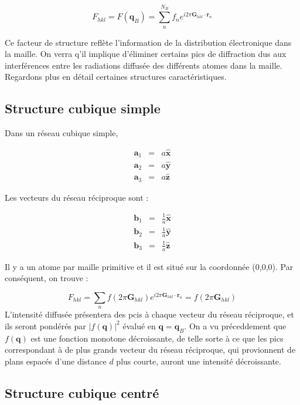 \begin{equation}
    F_{hkl} = F(\mathbf{q}_B) = \sum_n^{N_B} f_n e^{i2\pi \mathbf{G}_{hkl}\cdot\mathbf{r}_n}
\end{equation}

Ce facteur de structure reflète l'information de la distribution électronique
dans la maille. On verra q'il implique d'éliminer certains pics de diffraction
dus aux interférences entre les radiations diffusée des différents atomes dans
la maille.
Regardons plus en détail certaines structures caractéristiques.

\subsection{Structure cubique simple}

Dans un réseau cubique simple,

\begin{eqnarray}
    \mathbf{a}_1 & = & a \mathbf{\hat x} \\
    \mathbf{a}_2 & = & a \mathbf{\hat y} \\
    \mathbf{a}_3 & = & a \mathbf{\hat z}
\end{eqnarray}

Les vecteurs du réseau réciproque sont :

\begin{eqnarray}
    \mathbf{b}_1 & = & \frac{1}{a} \mathbf{\hat x} \\
    \mathbf{b}_2 & = & \frac{1}{a} \mathbf{\hat y} \\
    \mathbf{b}_3 & = & \frac{1}{a} \mathbf{\hat z}
\end{eqnarray}

Il y a un atome par maille primitive et il est situé sur la coordonnée (0,0,0).
Par conséquent, on trouve :

\begin{equation}
    F_{hkl} = \sum_n f(2\pi \mathbf{G}_{hkl}) e^{i 2\pi \mathbf{G}_{hkl}\cdot\mathbf{r}_n } = f(2\pi\mathbf{G}_{hkl})
\end{equation}
L'intensité diffusée présentera des pcis à chaque vecteur du réseau réciproque,
et ils seront pondérés par $|f(\mathbf{q})|^2$ évalué en $\mathbf{q = q}_B$. On a
vu préceddement que $f(\mathbf{q})$ est une fonction monotone décroissante,
de telle sorte à ce que les pics correspondant à de plus grands vecteur du
réseau réciproque, qui provionnent de plans espacés d'une distance $d$ plus
courte, auront une intensité décroissante.
\subsection{Structure cubique centré}

